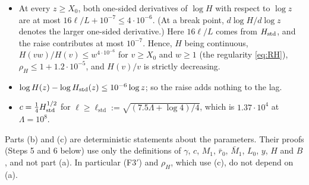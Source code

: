 \begin{theorem}
\begin{enumerate}[label=\textup{(\alph*)}]
\begin{itemize}
    across scales.
  \item At every $z\ge X_0$, both one-sided derivatives of $\log H$ with respect to $\log z$ are at most
    $16\ell/L+10^{-7}\le4\cdot10^{-6}$. (At a break point, $d\log H/d\log z$ denotes the larger one-sided derivative.) Here $16\ell/L$
    comes from $H_{\mathrm{std}}$, and the raise contributes at most $10^{-7}$.
    Hence, $H$ being continuous, $H(vw)/H(v)\le w^{4\cdot10^{-6}}$ for $v\ge X_0$ and $w\ge1$ (the regularity
    \eqref{eq:RH}), $\rho_H\le1+1.2\cdot10^{-5}$, and $H(v)/v$ is strictly decreasing.
  \item $\log H(z)-\log H_{\mathrm{std}}(z)\le10^{-6}\log z$; so the raise adds nothing to the lag.
  \item $c=\tfrac14H_{\mathrm{std}}^{1/2}$ for $\ell\ge\ell_{\mathrm{std}}:=\sqrt{(7.5\Lambda+\log4)/4}$, which is $1.37\cdot10^4$ at
    $\Lambda=10^8$.
  \end{itemize}
\end{enumerate}
Parts (b) and (c) are deterministic statements about the parameters. Their proofs (Steps 5 and 6 below) use only the
definitions of $\gamma$, $c$, $M_1$, $\bar r_0$, $\bar M_1$, $L_0$, $y$, $H$ and $B$, and not part (a). In particular (F3$'$) and $\rho_H$, which use
(c), do not depend on (a).
\end{theorem}

